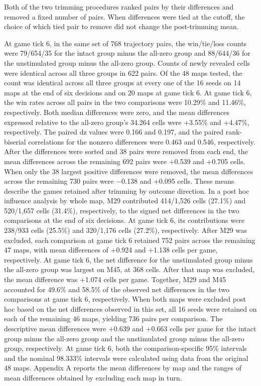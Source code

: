 \documentclass{article}
\begin{document}
Both of the two trimming procedures ranked pairs by their differences and removed a fixed number of pairs. When differences were tied at the cutoff, the choice of which tied pair to remove did not change the post-trimming mean.


At game tick 6, in the same set of 768 trajectory pairs, the win/tie/loss counts were 79/654/35 for the intact group minus the all-zero group and 88/644/36 for the unstimulated group minus the all-zero group. Counts of newly revealed cells were identical across all three groups in 622 pairs. Of the 48 maps tested, the count was identical across all three groups at every one of the 16 seeds on 14 maps at the end of six decisions and on 20 maps at game tick 6. At game tick 6, the win rates across all pairs in the two comparisons were 10.29\% and 11.46\%, respectively. Both median differences were zero, and the mean differences expressed relative to the all-zero group's 34.264 cells were +3.55\% and +4.47\%, respectively. The paired dz values were 0.166 and 0.197, and the paired rank-biserial correlations for the nonzero differences were 0.463 and 0.546, respectively. After the differences were sorted and 38 pairs were removed from each end, the mean differences across the remaining 692 pairs were +0.539 and +0.705 cells. When only the 38 largest positive differences were removed, the mean differences across the remaining 730 pairs were \ensuremath{-}0.138 and +0.095 cells. These means describe the games retained after trimming by outcome direction. In a post hoc influence analysis by whole map, M29 contributed 414/1,526 cells (27.1\%) and 520/1,657 cells (31.4\%), respectively, to the signed net differences in the two comparisons at the end of six decisions. At game tick 6, its contributions were 238/933 cells (25.5\%) and 320/1,176 cells (27.2\%), respectively. After M29 was excluded, each comparison at game tick 6 retained 752 pairs across the remaining 47 maps, with mean differences of +0.924 and +1.138 cells per game, respectively. At game tick 6, the net difference for the unstimulated group minus the all-zero group was largest on M45, at 368 cells. After that map was excluded, the mean difference was +1.074 cells per game. Together, M29 and M45 accounted for 49.6\% and 58.5\% of the observed net differences in the two comparisons at game tick 6, respectively. When both maps were excluded post hoc based on the net differences observed in this set, all 16 seeds were retained on each of the remaining 46 maps, yielding 736 pairs per comparison. The descriptive mean differences were +0.639 and +0.663 cells per game for the intact group minus the all-zero group and the unstimulated group minus the all-zero group, respectively. At game tick 6, both the comparison-specific 95\% intervals and the nominal 98.333\% intervals were calculated using data from the original 48 maps. Appendix A reports the mean differences by map and the ranges of mean differences obtained by excluding each map in turn.
\end{document}
